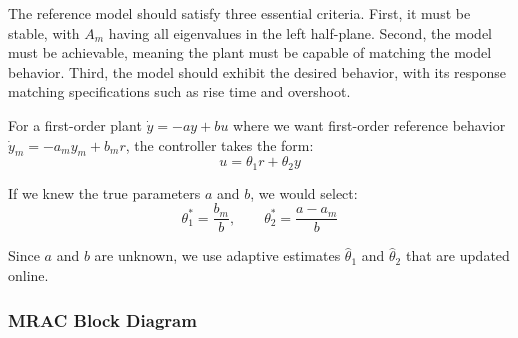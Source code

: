 \begin{keyconceptbox}[title=Reference Model Selection, sharp corners]
The reference model should satisfy three essential criteria. First, it must be stable, with $A_m$ having all eigenvalues in the left half-plane. Second, the model must be achievable, meaning the plant must be capable of matching the model behavior. Third, the model should exhibit the desired behavior, with its response matching specifications such as rise time and overshoot.
\end{keyconceptbox}

For a first-order plant $\dot{y} = -a y + b u$ where we want first-order reference behavior $\dot{y}_m = -a_m y_m + b_m r$, the controller takes the form:
\begin{equation}
u = \theta_1 r + \theta_2 y
\label{eq:mrac_first_order}
\end{equation}

If we knew the true parameters $a$ and $b$, we would select:
\begin{equation}
\theta_1^* = \frac{b_m}{b}, \qquad \theta_2^* = \frac{a - a_m}{b}
\label{eq:ideal_params}
\end{equation}

Since $a$ and $b$ are unknown, we use adaptive estimates $\hat{\theta}_1$ and $\hat{\theta}_2$ that are updated online.

\subsubsection{MRAC Block Diagram}

